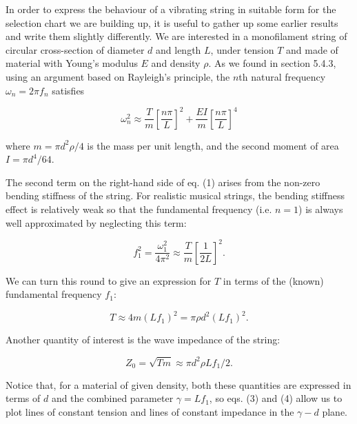   In order to express the behaviour of a vibrating string in suitable form for 
  the selection chart we are building up, it is useful to gather up some 
  earlier results and write them slightly differently. We are interested in a 
  monofilament string of circular cross-section of diameter $d$ and length $L$, 
  under tension $T$ and made of material with Young's modulus $E$ and density 
  $\rho$. As we found in section 5.4.3, using an argument based on Rayleigh's 
  principle, the $n$th natural frequency $\omega_n=2\pi f_n$ satisfies 

  \begin{equation*}\omega_n^2 \approx \dfrac{T}{m} \left[ \dfrac{n\pi}{L} 
  \right] ^2 + \dfrac{EI}{m} \left[ \dfrac{n\pi}{L} \right] ^4 
  \tag{1}\end{equation*} 

  \noindent{}where $m=\pi d^2 \rho /4$ is the mass per unit length, and the 
  second moment of area $I=\pi d^4 /64$. 

  The second term on the right-hand side of eq. (1) arises from the non-zero 
  bending stiffness of the string. For realistic musical strings, the bending 
  stiffness effect is relatively weak so that the fundamental frequency (i.e. 
  $n = 1$) is always well approximated by neglecting this term: 

  \begin{equation*}f_1^2 = \dfrac{\omega_1^2}{4 \pi^2} \approx 
  \dfrac{T}{m}\left[ \dfrac{1}{2L} \right] ^2 . \tag{2}\end{equation*} 

  We can turn this round to give an expression for $T$ in terms of the (known) 
  fundamental frequency $f_1$: 

  \begin{equation*}T \approx 4m(Lf_1)^2 = \pi \rho d^2 (Lf_1)^2 . 
  \tag{3}\end{equation*} 

  Another quantity of interest is the wave impedance of the string: 

  \begin{equation*}Z_0 = \sqrt{Tm} \approx \pi d^2 \rho L f_1 /2 . 
  \tag{4}\end{equation*} 

  Notice that, for a material of given density, both these quantities are 
  expressed in terms of $d$ and the combined parameter $\gamma=Lf_1$, so eqs. 
  (3) and (4) allow us to plot lines of constant tension and lines of constant 
  impedance in the $\gamma-d$ plane. 

